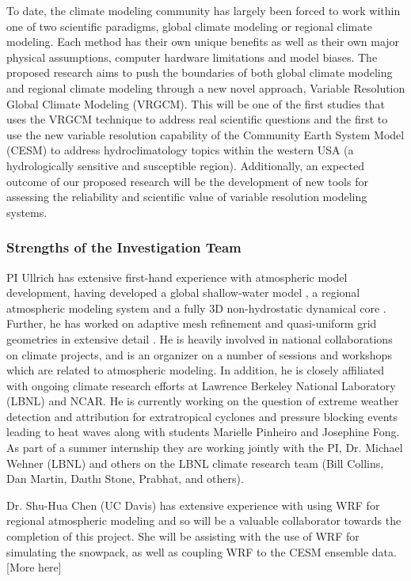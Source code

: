 \documentclass[11pt]{article}
\begin{document}
To date, the climate modeling community has largely been forced to work within one of two scientific paradigms, global climate modeling or regional climate modeling.  Each method has their own unique benefits as well as their own major physical assumptions, computer hardware limitations and model biases.  The proposed research aims to push the boundaries of both global climate modeling and regional climate modeling through a new novel approach, Variable Resolution Global Climate Modeling (VRGCM).  This will be one of the first studies that uses the VRGCM technique to address real scientific questions and the first to use the new variable resolution capability of the Community Earth System Model (CESM) to address hydroclimatology topics within the western USA (a hydrologically sensitive and susceptible region).  Additionally, an expected outcome of our proposed research will be the development of new tools for assessing the reliability and scientific value of variable resolution modeling systems. 

\subsubsection{Strengths of the Investigation Team}

PI Ullrich has extensive first-hand experience with atmospheric model development, having developed a global shallow-water model \citep{ullrich2010high}, a regional atmospheric modeling system \citep{ullrich2012operator} and a fully 3D non-hydrostatic dynamical core \citep{ullrich2012mcore}. Further, he has worked on adaptive mesh refinement and quasi-uniform grid geometries in extensive detail \citep{collins2013nonhydrostatic}. He is heavily involved in national collaborations on climate projects, and is an organizer on a number of sessions and workshops which are related to atmospheric modeling. In addition, he is closely affiliated with ongoing climate research efforts at Lawrence Berkeley National Laboratory (LBNL) and NCAR. He is currently working on the question of extreme weather detection and attribution for extratropical cyclones and pressure blocking events leading to heat waves along with students Marielle Pinheiro and Josephine Fong. As part of a summer internship they are working jointly with the PI, Dr. Michael Wehner (LBNL) and others on the LBNL climate research team (Bill Collins, Dan Martin, Daıthı Stone, Prabhat, and others).

Dr.  Shu-Hua Chen (UC Davis) has extensive experience with using WRF for regional atmospheric modeling and so will be a valuable collaborator towards the completion of this project. She will be assisting with the use of WRF for simulating the snowpack, as well as coupling WRF to the CESM ensemble data. {\color{red}[More here]}
\end{document}

